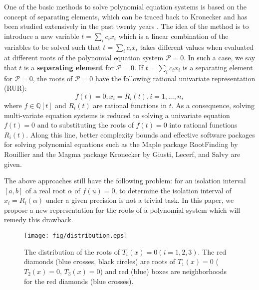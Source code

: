 \documentclass[amsthm]{JSC_LaTex_2007_Mar_12/elsart}
\def\Q{{\mathbb{Q}}}
\begin{document}
One of the basic methods to solve polynomial equation systems is
based on the concept of separating elements, which can be traced
back to Kronecker \cite{kronecker} and has been studied extensively
in the past twenty years
\cite{abrw,canny,chengjsc,gaochou,gm,gh,gls,kmh,kff,ll,renegar,rur,ynt}.
The idea of the method is to introduce a new variable $t=\sum_i
c_ix_i$ which is a linear combination of the variables to be solved
such that $t=\sum_i c_ix_i$ takes different values when evaluated
at different roots of the polynomial equation system
$\mathcal{P}=0$. In such a case, we say that $t$ is a {\bf
separating element} for $\mathcal{P}=0$. If $t=\sum_i c_ix_i$ is a
{separating element} for $\mathcal{P}=0$,  the roots of
$\mathcal{P}=0$ have the following rational univariate
representation (RUR):
$$f(t)=0, x_i=R_i(t), i=1,...,n,$$
where $f\in \Q[t]$ and $R_i(t)$ are rational functions in $t$. As a
consequence, solving multi-variate equation systems is reduced to
solving a univariate equation $f(t)=0$ and to substituting the roots
of $f(t)=0$ into rational functions $R_i(t)$.
Along this line, better complexity bounds and effective software
packages for solving polynomial equations such as the Maple package
RootFinding by Rouillier \cite{rur} and the Magma package Kronecker
by Giusti, Lecerf, and Salvy \cite{gls} are given.

The above approaches still have the following problem: for an
isolation interval $[a,b]$ of a real root $\alpha$ of $f(u)=0$, to
determine the isolation interval of $x_i=R_i(\alpha)$ under a given
precision is not a trivial task.
In this paper, we propose a new representation for the roots of a
polynomial system which will remedy this drawback.


\begin{figure}[ht]
\centering
\begin{minipage}{0.9\textwidth}
\centering
 \texttt{[image: fig/distribution.eps]}
 \caption{The distribution of the roots of $T_i(x)=0 (i=1,2,3)$. The red diamonds (blue crosses, black circles) are roots of $T_1(x)=0$ ($T_2(x)=0,\,T_3(x)=0$) and red (blue) boxes are neighborhoods for the red diamonds (blue crosses).}
\label{fig-slope}
\end{minipage}
\end{figure}
\end{document}
